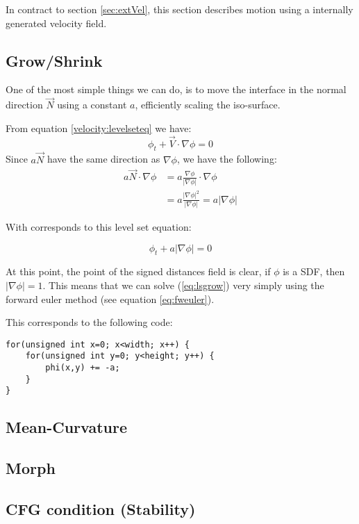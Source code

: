 

In contract to section \vref{sec:extVel}, this section describes
motion using a internally generated velocity field.

\newpage

\subsection{Grow/Shrink}

One of the most simple things we can do, is to move the interface in
the normal direction $\vec{N}$ using a constant $a$, efficiently
scaling the iso-surface.

From equation \vref{velocity:levelseteq} we have:
\begin{equation}
  \phi_t + \vec{V}\cdot \nabla \phi = 0
\end{equation}
Since $a\vec{N}$ have the same direction as $\nabla{\phi}$, we have the following:
\begin{align*}
  a\vec{N}\cdot\nabla\phi &=
  a\frac{\nabla\phi}{|\nabla\phi|}\cdot\nabla\phi \\
  &= a\frac{|\nabla\phi|^2}{|\nabla\phi|} 
  = a|\nabla\phi|
\end{align*}

With corresponds to this level set equation:

\begin{equation}
  \phi_t + a |\nabla \phi| = 0
\end{equation}\label{eq:lsgrow}

At this point, the point of the signed distances field is clear, if
$\phi$ is a SDF, then $|\nabla\phi| = 1$. This means that we can solve
(\ref{eq:lsgrow}) very simply using the forward euler method (see
equation \ref{eq:fweuler}).

This corresponds to the following code:

\begin{lstlisting}
for(unsigned int x=0; x<width; x++) {
    for(unsigned int y=0; y<height; y++) {
        phi(x,y) += -a;
    }
}
\end{lstlisting}


\subsection{Mean-Curvature}

\subsection{Morph}

\subsection{CFG condition (Stability)}



